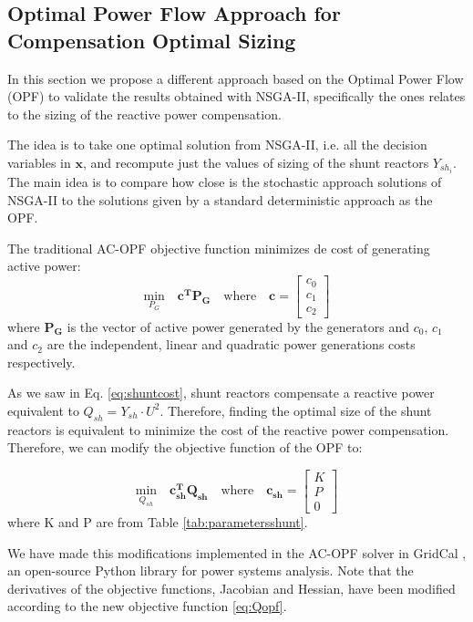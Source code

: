 \documentclass[a4paper,11pt, titlepage, twoside]{article}
\begin{document}
\subsection{Optimal Power Flow Approach for Compensation Optimal Sizing}

In this section we propose a different approach based on the Optimal Power Flow (OPF) to validate the results obtained with NSGA-II, specifically the ones relates to
the sizing of the reactive power compensation.\par 

The idea is to take one optimal solution from NSGA-II, i.e. all the decision variables in $\mathbf{x}$, and recompute just the values of sizing of the shunt reactors $Y_{sh_i}$. The main idea is to compare how close is the 
stochastic approach solutions of NSGA-II to the solutions given by a standard deterministic approach as the OPF. \par


The traditional AC-OPF objective function \cite{opfnotes} minimizes de cost of generating active power:
\begin{equation}
    \underset{P_G}{\text{min}} \quad \mathbf{c^T} \mathbf{P_G} \quad \text{where} \quad \mathbf{c} = \begin{bmatrix} c_0 \\ c_1 \\ c_2 \end{bmatrix}
\end{equation}
where $\mathbf{P_G}$ is the vector of active power generated by the generators and $c_0$, $c_1$ and $c_2$ are the independent, linear and quadratic power generations costs respectively.

As we saw in Eq. \ref{eq:shuntcost}, shunt reactors compensate a reactive power equivalent to $Q_{sh} = Y_{sh} \cdot U^2$. Therefore, finding the optimal size of the shunt reactors is equivalent
to minimize the cost of the reactive power compensation. Therefore,  we can modify the objective function of the OPF to:

\begin{equation}\label{eq:Qopf}
\underset{Q_{sh}}{\text{min}} \quad \mathbf{c_{sh}^T} \mathbf{Q_{sh}} \quad \text{where} \quad \mathbf{c_{sh}} = \begin{bmatrix} K \\ P \\ 0 \end{bmatrix}
\end{equation}
where K and P are from Table \ref{tab:parametersshunt}.\par
We have made this modifications implemented in the AC-OPF solver in GridCal \cite{gridcal}, an open-source Python library for power systems analysis. Note that the derivatives of the objective functions, Jacobian and Hessian, have
been modified according to the new objective function \ref{eq:Qopf}.
\end{document}
